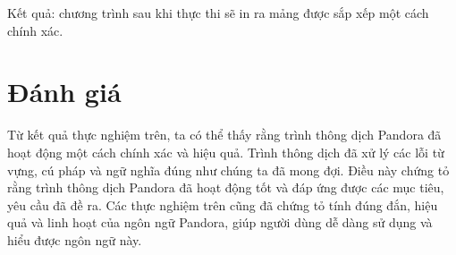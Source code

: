     Kết quả: chương trình sau khi thực thi sẽ in ra mảng được sắp xếp một cách chính xác.

\section{Đánh giá}

    Từ kết quả thực nghiệm trên, ta có thể thấy rằng trình thông dịch Pandora đã hoạt động một cách chính xác và hiệu quả. Trình thông dịch đã xử lý các lỗi từ vựng, cú pháp và ngữ nghĩa đúng như chúng ta đã mong đợi. Điều này chứng tỏ rằng trình thông dịch Pandora đã hoạt động tốt và đáp ứng được các mục tiêu, yêu cầu đã đề ra. Các thực nghiệm trên cũng đã chứng tỏ tính đúng đắn, hiệu quả và linh hoạt của ngôn ngữ Pandora, giúp người dùng dễ dàng sử dụng và hiểu được ngôn ngữ này.
